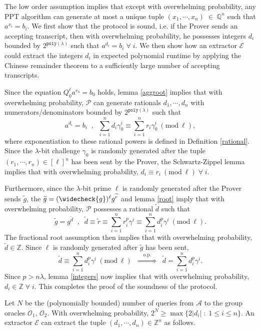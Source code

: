 \documentclass[11pt, lettersize, notitlepage, leqno, footskip=0.6cm]{article}
\newcommand{\bz}{\mathbb Z}
\newcommand{\bq}{\mathbb Q}
\newcommand{\slim}{\sum\limits}
\newcommand{\ttt}{\texttt}
\newcommand{\impop}{\overset{\;\;\;\;\mr{o.p.}\;\;\;\;}{\Longrightarrow}}
\newcommand{\wti}{\widetilde}
\newcommand{\mc}{\mathcal}
\newcommand{\mr}{\mathrm}
\newcommand{\lam}{\lambda}
\newcommand{\weck}{\widecheck}
\newcommand{\mP}{\mc{P}}
\newcommand{\A}{\mc{A}}
\newcommand{\vs}{\vspace{-0.15cm}}
\newcommand{\op}{overwhelming probability}
\newcommand{\Mod}[1]{\ (\mathrm{mod}\ #1)}
\newcommand{\E}{\mc{E}}
\numberwithin{equation}{section}
\begin{document}
\begin{prf} The low order assumption implies that except with \op, any PPT algorithm can generate at most a unique tuple $(x_1,\cdots,x_n)\;\in\;\bq^n$ such that $a^{x_i} = b_i$. We first show that the protocol is sound, i.e. if the Prover sends an accepting transcript, then with \op, he possesses integers $d_i$ bounded by $2^{\ttt{poly}(\lam)}$ such that $a^{d_i} = b_i\;\forall\;i$. We then show how an extractor $\E$ could extract the integers $d_i$ in expected polynomial runtime by applying the Chinese remainder theorem to a sufficiently large number of accepting transcripts. 

Since the equation $Q_0^{\ell}a^{r_0} = b_0$ holds, lemma \ref{aggroot} implies that with \op, 
$\mP$ can generate rationals $d_1,\cdots,d_n$ with numerators/denominators bounded by $2^{\ttt{poly}(\lam)}$ such that \vs $$a^{d_i} = b_i \;\;,\;\;\slim_{i=1}^{n} d_i\gamma_{0}^i \equiv \slim_{i=1}^{n} r_i\gamma_{0}^i\Mod{\ell},$$ where exponentiation to these rational powers is defined in Definition \ref{rational}. Since the $\lam$-bit challenge $\gamma_{0}$ is randomly generated after the tuple $(r_1,\cdots,r_n)\in[\ell]^n$ has been sent by the Prover, the Schwartz-Zippel lemma implies that with \op, $d_i\equiv r_i\Mod{\ell}\;\forall\;i$. 

Furthermore, since the $\lam$-bit prime $\ell$ is randomly generated after the Prover sends $\wti{g}$, the $\wti{g} = (\weck{g})^{\ell}g^{\wti{r}}$ and lemma \ref{root} imply that with \op, $\mP$ possesses a rational $\wti{d}$ such that \vs $$\wti{g} = g^{\wti{d}}\;\;,\;\;\wti{d}\equiv\wti{r}\equiv \slim_{i=1}^n r_i^p\gamma^i\equiv \slim_{i=1}^n d_i^p\gamma^i\Mod{\ell} .$$ The fractional root assumption then implies that with \op, $\wti{d}\in \bz$. Since $\ell$ is randomly generated after $\wti{g}$ has been sent, \vs $$\wti{d}\equiv \slim_{i=1}^n d_i^p\gamma^i\Mod{\ell}\;\;\impop\;\;\wti{d} = \slim_{i=1}^n d_i^p\gamma^i.$$ Since $p> n\lam$, lemma \ref{integers} now implies that with \op, $d_i\in\bz\;\forall\;i$. This completes the proof of the soundness of the protocol.

Let $N$ be the (polynomially bounded) number of queries from $\A$ to the group oracles $\mc{O}_1$, $\mc{O}_2$. With \op, $2^{N} \geq \max\{2|d_i|\;:\;1\leq i\leq n \}$. An extractor $\E$ can extract the tuple $(d_1,\cdots,d_n)\in\bz^n$ as follows. 


\end{prf}
\end{document}
